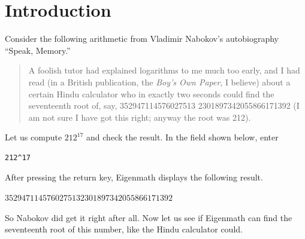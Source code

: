 \section{Introduction}

\noindent
Consider the following arithmetic from Vladimir Nabokov's autobiography ``Speak, Memory.''

\begin{quote}
A foolish tutor had explained logarithms to me much too early, and I had
read (in a British publication, the {\it Boy's Own Paper}, I believe)
about a certain Hindu calculator who in exactly two seconds could find the
seventeenth root of, say,
352947114576027513 2301897342055866171392
(I am not sure I have got this right; anyway the root was 212).
\end{quote}

\noindent
Let us compute $212^{17}$ and check the result.
In the field shown below, enter

{\color{blue}
\begin{verbatim}
212^17
\end{verbatim}
}

\begin{center}
\end{center}

\noindent
After pressing the return key, Eigenmath displays the following result.

\bigskip
\noindent
$3529471145760275132301897342055866171392$

\bigskip
\noindent
So Nabokov did get it right after all.
Now let us see if Eigenmath can find the
seventeenth root of this number, like the Hindu calculator could.


